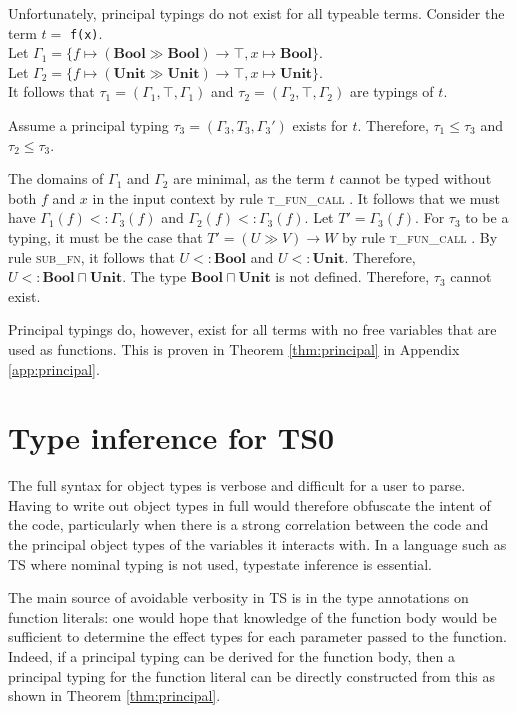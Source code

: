\documentclass[preprint]{sigplanconf}
\newcommand{\appref}[1]{Appendix \ref{#1}}
\newcommand{\thmref}[1]{Theorem \ref{#1}}
\newcommand{\tfunc}{\textsc{t\_fun\_call} }
\newcommand{\subfn}{\textsc{sub\_fn}}
\newcommand{\unitt}{\mathbf{Unit}}
\newcommand{\boolt}{\mathbf{Bool}}
\begin{document}
Unfortunately, principal typings do not exist for all typeable terms.
Consider the term $t = $ {\tt f(x)}. \\
Let $\Gamma_1 = \{f \mapsto (\boolt \gg \boolt) \rightarrow \top, x \mapsto \boolt \}$. \\
Let $\Gamma_2 = \{f \mapsto (\unitt \gg \unitt) \rightarrow \top, x \mapsto \unitt \}$. \\
It follows that $\tau_1 = (\Gamma_1, \top, \Gamma_1)$
and $\tau_2 = (\Gamma_2, \top, \Gamma_2)$ are typings of $t$. 

Assume a principal typing $\tau_3 = (\Gamma_3, T_3, \Gamma_3')$ exists for $t$.
Therefore, $\tau_1 \leq \tau_3$ and $\tau_2 \leq \tau_3$.

The domains of $\Gamma_1$ and $\Gamma_2$ are minimal, as the term $t$
cannot be typed without both $f$ and $x$ in the input context by rule \tfunc.
It follows that we must have
$\Gamma_1(f) <: \Gamma_3(f)$ and $\Gamma_2(f) <: \Gamma_3(f)$. 
Let $T' = \Gamma_3(f)$. For $\tau_3$ to be a typing, it must be the case that
$T' = (U \gg V) \rightarrow W$ by rule \tfunc. By rule \subfn, it follows that
$U <: \boolt$ and $U <: \unitt$. Therefore, $U <: \boolt \sqcap \unitt$.
The type $\boolt \sqcap \unitt$ is not defined.
Therefore, $\tau_3$ cannot exist.

Principal typings do, however, exist for all
terms with no free variables that are used as functions. This is proven
in \thmref{thm:principal} in \appref{app:principal}.

\section{Type inference for TS0}

The full syntax for object types is verbose and difficult for a user to parse.
Having to write out object types in full would therefore obfuscate the
intent of the code, particularly when there is a
strong correlation between the code and the principal object types of the
variables it interacts with. In a language such as TS where nominal typing
is not used, typestate inference is essential.

The main source of avoidable verbosity in TS is in the
type annotations on function literals: one would hope that knowledge of
the function body would be sufficient to determine the effect types for
each parameter passed to the function. Indeed, if a principal typing can
be derived for the function body, then a principal typing for the function
literal can be directly constructed from this as shown in
\thmref{thm:principal}. 
\end{document}
